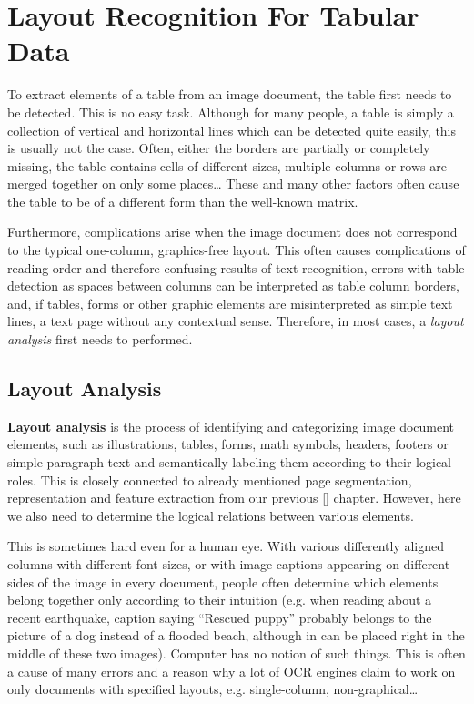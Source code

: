 \chapter{Layout Recognition For Tabular Data}

To extract elements of a table from an image document, the table first needs to be detected. This is no easy task.  Although for many people, a table is simply a collection of vertical and horizontal lines which can be detected quite easily, this is usually not the case.  Often, either the borders are partially or completely missing, the table contains cells of different sizes, multiple columns or rows are merged together on only some places… These and many other factors often cause the table to be of a different form than the well-known matrix. 

Furthermore, complications arise when the image document does not correspond to the typical one-column, graphics-free layout. This often causes complications of reading order and therefore confusing results of text recognition, errors with table detection as spaces between columns can be interpreted as table column borders, and, if tables, forms or other graphic elements are misinterpreted as simple text lines, a text page without any contextual sense. Therefore, in most cases, a \emph{layout analysis} first needs to performed.

\section{Layout Analysis}

\textbf{Layout analysis} is the process of identifying and categorizing image document elements, such as illustrations, tables, forms, math symbols, headers, footers or simple paragraph text and semantically labeling them according to their logical roles.
This is closely connected to already mentioned page segmentation, representation and feature extraction from our previous [] chapter. However, here we also need to determine the logical relations between various elements.

This is sometimes hard even for a human eye. With various differently aligned columns with different font sizes, or with image captions appearing on different sides of the image in every document, people often determine which elements belong together only according to their intuition (e.g. when reading about a recent earthquake, caption saying “Rescued puppy” probably belongs to the picture of a dog instead of a flooded beach, although in can be placed right in the middle of these two images). Computer has no notion of such things. This is often a cause of many errors and a reason why a lot of OCR engines claim to work on only documents with specified layouts, e.g. single-column, non-graphical…

